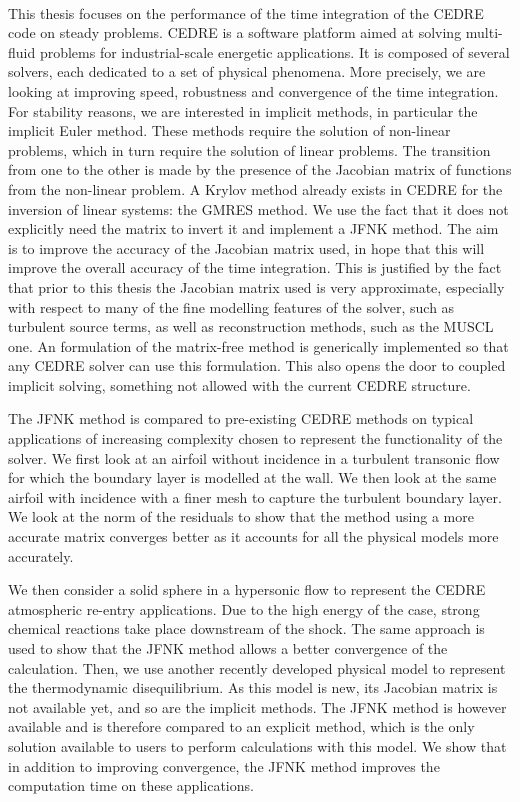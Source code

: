     \paragraph{}
This thesis focuses on the performance of the time integration of the CEDRE code on steady problems.
CEDRE is a software platform aimed at solving multi-fluid problems for industrial-scale energetic applications.
It is composed of several solvers, each dedicated to a set of physical phenomena.
More precisely, we are looking at improving speed, robustness and convergence of the time integration.
For stability reasons, we are interested in implicit methods, in particular the implicit Euler method.
These methods require the solution of non-linear problems, which in turn require the solution of linear problems.
The transition from one to the other is made by the presence of the Jacobian matrix of functions from the non-linear problem.
A Krylov method already exists in CEDRE for the inversion of linear systems: the GMRES method.
We use the fact that it does not explicitly need the matrix to invert it and implement a JFNK method.
The aim is to improve the accuracy of the Jacobian matrix used, in hope that this will improve the overall accuracy of the time integration.
This is justified by the fact that prior to this thesis the Jacobian matrix used is very approximate, especially with respect to many of the fine modelling features of the solver, such as turbulent source terms, as well as reconstruction methods, such as the MUSCL one.
An formulation of the matrix-free method is generically implemented so that any CEDRE solver can use this formulation.
This also opens the door to coupled implicit solving, something not allowed with the current CEDRE structure.

The JFNK method is compared to pre-existing CEDRE methods on typical applications of increasing complexity chosen to represent the functionality of the solver.
We first look at an airfoil without incidence in a turbulent transonic flow for which the boundary layer is modelled at the wall.
We then look at the same airfoil with incidence with a finer mesh to capture the turbulent boundary layer.
We look at the norm of the residuals to show that the method using a more accurate matrix converges better as it accounts for all the physical models more accurately.

We then consider a solid sphere in a hypersonic flow to represent the CEDRE atmospheric re-entry applications.
Due to the high energy of the case, strong chemical reactions take place downstream of the shock.
The same approach is used to show that the JFNK method allows a better convergence of the calculation.
Then, we use another recently developed physical model to represent the thermodynamic disequilibrium.
As this model is new, its Jacobian matrix is not available yet, and so are the implicit methods.
The JFNK method is however available and is therefore compared to an explicit method, which is the only solution available to users to perform calculations with this model.
We show that in addition to improving convergence, the JFNK method improves the computation time on these applications.

